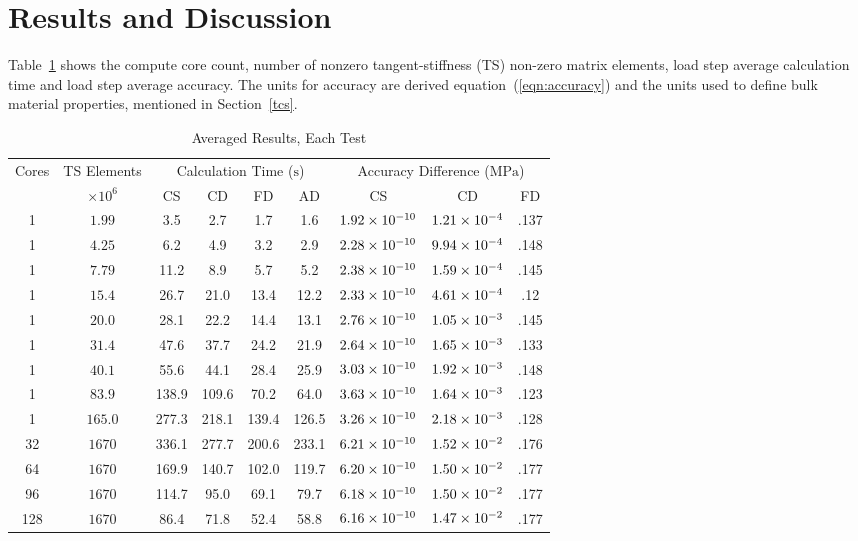 \documentclass[preprint,12pt]{elsarticle}
\begin{document}
\section{Results and Discussion}
%
Table~\ref{tab:results} shows the compute core count, number of nonzero tangent-stiffness (TS) non-zero matrix elements, load step average calculation time and load step average accuracy. The units for accuracy are derived equation~(\ref{eqn:accuracy}) and the units used to define bulk material properties, mentioned in Section~\ref{tcs}.
%
\begin{table}[!ht]    
  \scriptsize
  \centering
        \caption{Averaged Results, Each Test} \label{tab:results}   
       \begin{tabular}{c c c c c c c c c}
         \toprule
         Cores & TS Elements & \multicolumn{4}{c}{Calculation Time ($\si{\second}$)} & \multicolumn{3}{c}{Accuracy Difference ($\si{\mega\pascal}$)} \\ 
         & $\times 10^6$ & CS & CD & FD & AD & CS & CD & FD \\
        \midrule
        1 & $\num{1.99}$  & 3.5 & 2.7 & 1.7 & 1.6 & $\num{1.92E-10}$ & $\num{1.21E-4}$ & .137 \\
        1 & $\num{4.25}$  & 6.2& 4.9& 3.2& 2.9 & $\num{2.28E-10}$& $\num{9.94E-4}$ & .148 \\
        1 & $\num{7.79}$  & 11.2& 8.9& 5.7& 5.2 & $\num{2.38E-10}$& $\num{1.59E-4}$ & .145\\
        1 & $\num{15.4}$  & 26.7& 21.0& 13.4& 12.2 & $\num{2.33E-10}$ & $\num{4.61E-4}$ & .12 \\
        1 & $\num{20.0}$  & 28.1& 22.2& 14.4& 13.1 & $\num{2.76E-10}$ & $\num{1.05E-3}$ & .145 \\
        1 & $\num{31.4}$  & 47.6& 37.7& 24.2& 21.9 & $\num{2.64E-10}$ & $\num{1.65E-3}$ & .133 \\
        1 & $\num{40.1}$  & 55.6& 44.1& 28.4& 25.9 & $\num{3.03E-10}$ & $\num{1.92E-3}$ & .148 \\
        1 & $\num{83.9}$  & 138.9& 109.6& 70.2& 64.0 & $\num{3.63E-10}$ & $\num{1.64E-3}$ & .123 \\
        1 & $\num{165.0}$  & 277.3& 218.1& 139.4& 126.5 & $\num{3.26E-10}$ & $\num{2.18E-3}$ & .128 \\
        32 & $\num{1670}$  & 336.1& 277.7& 200.6& 233.1 & $\num{6.21E-10}$ & $\num{1.52E-2}$ & .176 \\
        64 & $\num{1670}$  & 169.9& 140.7& 102.0& 119.7 & $\num{6.20E-10}$ & $\num{1.50E-2}$ & .177 \\
        96 & $\num{1670}$  & 114.7& 95.0& 69.1 & 79.7 & $\num{6.18E-10}$ & $\num{1.50E-2}$ & .177 \\
        128 & $\num{1670}$  & 86.4& 71.8& 52.4 &58.8 & $\num{6.16E-10}$ & $\num{1.47E-2}$ & .177 \\
        \bottomrule
    \end{tabular}
\end{table}
\end{document}
